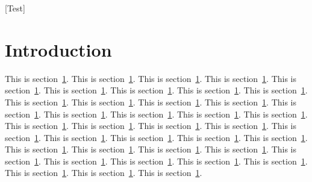 \documentclass{sig-alternate}
\begin{document}
[Test]

\section{Introduction}\label{sec:intro}

This is section~\ref{sec:intro}. This is section~\ref{sec:intro}. This is
section~\ref{sec:intro}. This is section~\ref{sec:intro}. This is
section~\ref{sec:intro}. This is section~\ref{sec:intro}. This is
section~\ref{sec:intro}. This is section~\ref{sec:intro}. This is
section~\ref{sec:intro}. This is section~\ref{sec:intro}. This is
section~\ref{sec:intro}. This is section~\ref{sec:intro}. This is
section~\ref{sec:intro}. This is section~\ref{sec:intro}. This is
section~\ref{sec:intro}. This is section~\ref{sec:intro}. This is
section~\ref{sec:intro}. This is section~\ref{sec:intro}. This is
section~\ref{sec:intro}. This is section~\ref{sec:intro}. This is
section~\ref{sec:intro}. This is section~\ref{sec:intro}. This is
section~\ref{sec:intro}. This is section~\ref{sec:intro}. This is
section~\ref{sec:intro}. This is section~\ref{sec:intro}. This is
section~\ref{sec:intro}. This is section~\ref{sec:intro}. This is
section~\ref{sec:intro}. This is section~\ref{sec:intro}. This is
section~\ref{sec:intro}. This is section~\ref{sec:intro}. This is
section~\ref{sec:intro}. This is section~\ref{sec:intro}. This is
section~\ref{sec:intro}. This is section~\ref{sec:intro}. This is
section~\ref{sec:intro}. This is section~\ref{sec:intro}.
This is section~\ref{sec:intro}.  
\end{document}
